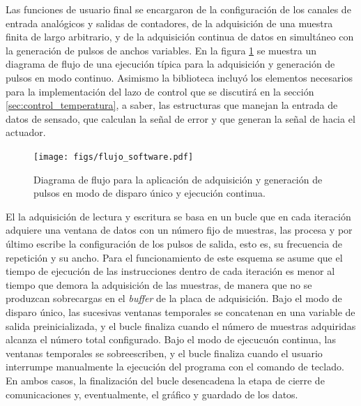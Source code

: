 \documentclass[a4paper,11pt]{article}
\begin{document}
	Las funciones de usuario final se encargaron de la configuración de los canales de entrada analógicos y salidas de contadores, de la adquisición de una muestra finita de largo arbitrario, y de la adquisición continua de datos en simultáneo con la generación de pulsos de anchos variables. En la figura \ref{fig:flujo_software} se muestra un diagrama de flujo de una ejecución típica para la adquisición y generación de pulsos en modo continuo. Asimismo la biblioteca incluyó los elementos necesarios para la implementación del lazo de control que se discutirá en la sección \ref{sec:control_temperatura}, a saber, las estructuras que manejan la entrada de datos de sensado, que calculan la señal de error y que generan la señal de hacia el actuador.
	
	\begin{figure}[h!]
        \centering
        \texttt{[image: figs/flujo\_software.pdf]}
        \caption{Diagrama de flujo para la aplicación de adquisición y generación de pulsos en modo de disparo único y ejecución continua.}
        \label{fig:flujo_software}
    \end{figure}	
	
	El la adquisición de lectura y escritura se basa en un bucle que en cada iteración adquiere una ventana de datos con un número fijo de muestras, las procesa y por último escribe la configuración de los pulsos de salida, esto es, su frecuencia de repetición y su ancho. Para el funcionamiento de este esquema se asume que el tiempo de ejecución de las instrucciones dentro de cada iteración es menor al tiempo que demora la adquisición de las muestras, de manera que no se produzcan sobrecargas en el \emph{buffer} de la placa de adquisición. Bajo el modo de disparo único, las sucesivas ventanas temporales se concatenan en una variable de salida preinicializada, y el bucle finaliza cuando el número de muestras adquiridas alcanza el número total configurado. Bajo el modo de ejecucuón continua, las ventanas temporales se sobreescriben, y el bucle finaliza cuando el usuario interrumpe manualmente la ejecución del programa con el comando de teclado. En ambos casos, la finalización del bucle desencadena la etapa de cierre de comunicaciones y, eventualmente, el gráfico y guardado de los datos.
	
\end{document}
